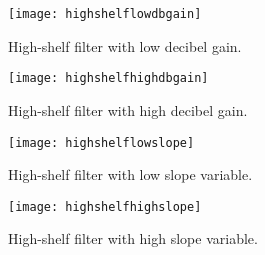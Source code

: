 \begin{figure}[!h] 
\centering
\texttt{[image: highshelflowdbgain]}
\caption{\label{fig:highshelflowdbgain} High-shelf filter with low decibel gain.}
\end{figure}

\begin{figure}[!h] 
\centering
\texttt{[image: highshelfhighdbgain]}
\caption{\label{fig:highshelfhighdbgain} High-shelf filter with high decibel gain.}
\end{figure}

\begin{figure}[!h] 
\centering
\texttt{[image: highshelflowslope]}
\caption{\label{fig:highshelflowslope} High-shelf filter with low slope variable.}
\end{figure}

\begin{figure}[!h] 
\centering
\texttt{[image: highshelfhighslope]}
\caption{\label{fig:highshelfhighslope} High-shelf filter with high slope variable.}
\end{figure}